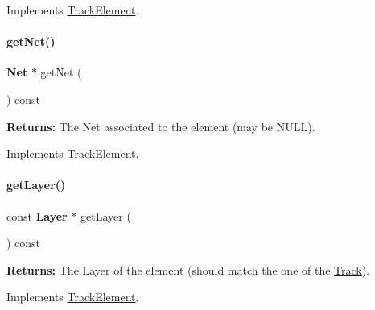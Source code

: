 Implements \hyperlink{classKite_1_1TrackElement_ae35b78590ed6aa546b626ef95f28c533}{Track\+Element}.

\mbox{\label{classKite_1_1TrackFixedSegment_a692492374623a5c6096b2c4a51190359}} 
\paragraph{\texorpdfstring{get\+Net()}{getNet()}}
{\footnotesize\ttfamily \textbf{ Net} $\ast$ get\+Net (\begin{DoxyParamCaption}{ }\end{DoxyParamCaption}) const\hspace{0.3cm}{\ttfamily [virtual]}}

{\bfseries Returns\+:} The Net associated to the element (may be {\ttfamily N\+U\+LL}). 

Implements \hyperlink{classKite_1_1TrackElement_a2b383a5b6f5028911a35e446a682dabd}{Track\+Element}.

\mbox{\label{classKite_1_1TrackFixedSegment_ab045567c4f529dca7790d66c17c3084f}} 
\paragraph{\texorpdfstring{get\+Layer()}{getLayer()}}
{\footnotesize\ttfamily const \textbf{ Layer} $\ast$ get\+Layer (\begin{DoxyParamCaption}{ }\end{DoxyParamCaption}) const\hspace{0.3cm}{\ttfamily [virtual]}}

{\bfseries Returns\+:} The Layer of the element (should match the one of the \hyperlink{classKite_1_1Track}{Track}). 

Implements \hyperlink{classKite_1_1TrackElement_ad96c66549598873bf68c2e18ec7164c1}{Track\+Element}.

\mbox{\label{classKite_1_1TrackFixedSegment_a010b7fc8801c5b88aefa4137cf85186d}} 
